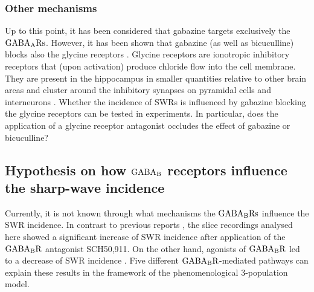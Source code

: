     \subsubsection{Other mechanisms} 
      Up to this point, it has been considered that gabazine targets
      exclusively the $\rm GABA_ARs$. However, it has been shown that gabazine
      (as well as bicuculline) blocks also the glycine receptors
      \citep{Wang2005, Li2007}. Glycine receptors are ionotropic inhibitory
      receptors that (upon activation) produce chloride flow into the cell
      membrane. They are present in the hippocampus in smaller quantities
      relative to other brain areas \citep{denPol1988} and cluster around the
      inhibitory synapses on pyramidal cells and interneurons \citep{Levi2004}.
      Whether the incidence of SWRs is influenced by gabazine blocking the
      glycine receptors can be tested in experiments. In particular, does the
      application of a glycine receptor antagonist occludes the effect of
      gabazine or bicuculline?

  \subsection{Hypothesis on how $\rm GABA_B$ receptors influence the sharp-wave incidence} 
    Currently, it is not known through what mechanisms the $\rm GABA_BRs$
    influence the SWR incidence. In contrast to previous reports
    \citep[e.g.,][]{Hollnagel2014, Hofer2015}, the slice recordings analysed
    here showed a significant increase of SWR incidence after application of the
    $\rm GABA_BR$ antagonist SCH50,911. On the other hand, agonists of $\rm
    GABA_BR$ led to a decrease of SWR incidence \citep{Maier2012,
    Hollnagel2014}. Five different $\rm GABA_BR$-mediated pathways can explain
    these results in the framework of the phenomenological 3-population model.
     
